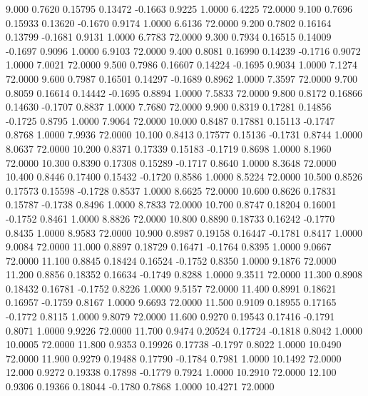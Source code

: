    9.000   0.7620   0.15795   0.13472  -0.1663   0.9225   1.0000   6.4225  72.0000
   9.100   0.7696   0.15933   0.13620  -0.1670   0.9174   1.0000   6.6136  72.0000
   9.200   0.7802   0.16164   0.13799  -0.1681   0.9131   1.0000   6.7783  72.0000
   9.300   0.7934   0.16515   0.14009  -0.1697   0.9096   1.0000   6.9103  72.0000
   9.400   0.8081   0.16990   0.14239  -0.1716   0.9072   1.0000   7.0021  72.0000
   9.500   0.7986   0.16607   0.14224  -0.1695   0.9034   1.0000   7.1274  72.0000
   9.600   0.7987   0.16501   0.14297  -0.1689   0.8962   1.0000   7.3597  72.0000
   9.700   0.8059   0.16614   0.14442  -0.1695   0.8894   1.0000   7.5833  72.0000
   9.800   0.8172   0.16866   0.14630  -0.1707   0.8837   1.0000   7.7680  72.0000
   9.900   0.8319   0.17281   0.14856  -0.1725   0.8795   1.0000   7.9064  72.0000
  10.000   0.8487   0.17881   0.15113  -0.1747   0.8768   1.0000   7.9936  72.0000
  10.100   0.8413   0.17577   0.15136  -0.1731   0.8744   1.0000   8.0637  72.0000
  10.200   0.8371   0.17339   0.15183  -0.1719   0.8698   1.0000   8.1960  72.0000
  10.300   0.8390   0.17308   0.15289  -0.1717   0.8640   1.0000   8.3648  72.0000
  10.400   0.8446   0.17400   0.15432  -0.1720   0.8586   1.0000   8.5224  72.0000
  10.500   0.8526   0.17573   0.15598  -0.1728   0.8537   1.0000   8.6625  72.0000
  10.600   0.8626   0.17831   0.15787  -0.1738   0.8496   1.0000   8.7833  72.0000
  10.700   0.8747   0.18204   0.16001  -0.1752   0.8461   1.0000   8.8826  72.0000
  10.800   0.8890   0.18733   0.16242  -0.1770   0.8435   1.0000   8.9583  72.0000
  10.900   0.8987   0.19158   0.16447  -0.1781   0.8417   1.0000   9.0084  72.0000
  11.000   0.8897   0.18729   0.16471  -0.1764   0.8395   1.0000   9.0667  72.0000
  11.100   0.8845   0.18424   0.16524  -0.1752   0.8350   1.0000   9.1876  72.0000
  11.200   0.8856   0.18352   0.16634  -0.1749   0.8288   1.0000   9.3511  72.0000
  11.300   0.8908   0.18432   0.16781  -0.1752   0.8226   1.0000   9.5157  72.0000
  11.400   0.8991   0.18621   0.16957  -0.1759   0.8167   1.0000   9.6693  72.0000
  11.500   0.9109   0.18955   0.17165  -0.1772   0.8115   1.0000   9.8079  72.0000
  11.600   0.9270   0.19543   0.17416  -0.1791   0.8071   1.0000   9.9226  72.0000
  11.700   0.9474   0.20524   0.17724  -0.1818   0.8042   1.0000  10.0005  72.0000
  11.800   0.9353   0.19926   0.17738  -0.1797   0.8022   1.0000  10.0490  72.0000
  11.900   0.9279   0.19488   0.17790  -0.1784   0.7981   1.0000  10.1492  72.0000
  12.000   0.9272   0.19338   0.17898  -0.1779   0.7924   1.0000  10.2910  72.0000
  12.100   0.9306   0.19366   0.18044  -0.1780   0.7868   1.0000  10.4271  72.0000
